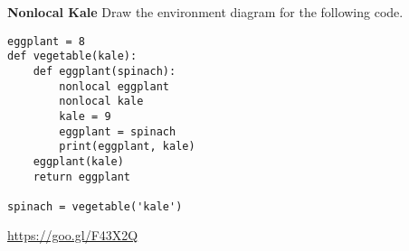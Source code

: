 \begin{blocksection}
\question \textbf{Nonlocal Kale} \newline
Draw the environment diagram for the following code.

\begin{lstlisting}
eggplant = 8
def vegetable(kale):
    def eggplant(spinach):
        nonlocal eggplant
        nonlocal kale
        kale = 9
        eggplant = spinach
        print(eggplant, kale)
    eggplant(kale)
    return eggplant

spinach = vegetable('kale')
\end{lstlisting}

\begin{solution}[1.5in]
\url{https://goo.gl/F43X2Q}
\end{solution}
\end{blocksection}
